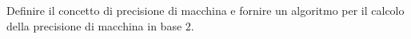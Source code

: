 Definire il concetto di precisione di macchina e fornire un 
algoritmo per il calcolo della precisione di macchina in base $2$.
